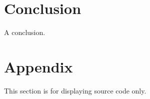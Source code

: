 \documentclass[a4paper, 10pt, conference]{ieeeconf}
\begin{document}
\section{Conclusion}

A conclusion.




\section{Appendix}

This section is for displaying source code only.\\
% 
\end{document}
